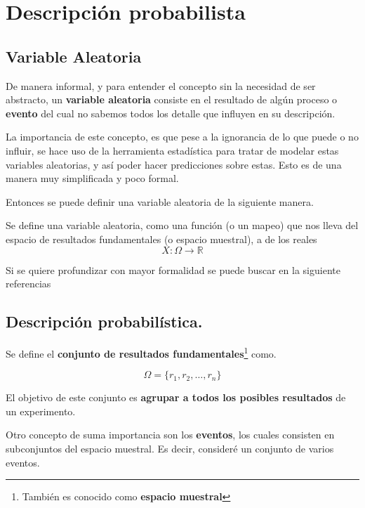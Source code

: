 \chapter{Descripción probabilista}
\label{cap:cap1}

\section{Variable Aleatoria}

De manera informal, y para entender el concepto sin la necesidad de ser abstracto, un \textbf{variable aleatoria} consiste en el resultado de algún proceso o \textbf{evento} del cual no sabemos todos los detalle que influyen en su descripción. 

La importancia de este concepto, es que pese a la ignorancia de lo que puede o no influir, se hace uso de la herramienta estadística para tratar de modelar estas variables aleatorias, y así poder hacer predicciones sobre estas. Esto es de una manera muy simplificada y poco formal.

Entonces se puede definir una variable aleatoria de la siguiente manera.
\begin{definicion}
    Se define una variable aleatoria, como una función (o un mapeo) que nos lleva del espacio de resultados fundamentales (o espacio muestral), a  de los reales 
$$X: \Omega \rightarrow \mathbb{R}$$
\end{definicion}

Si se quiere profundizar con mayor formalidad se puede buscar en la siguiente referencias \cite{RincónInterm}


\section{Descripción probabilística.}

Se define el \textbf{conjunto de resultados fundamentales}\footnote{También es conocido como \textbf{espacio muestral}} como.

\begin{equation*}
    \Omega = \{r_1,r_2,\dots,r_n\}
\end{equation*}

El objetivo de este conjunto es \textbf{agrupar a todos los posibles resultados} de un experimento.

Otro concepto de suma importancia son los \textbf{eventos}, los cuales consisten en subconjuntos del espacio muestral. Es decir, consideré un conjunto de varios eventos.

